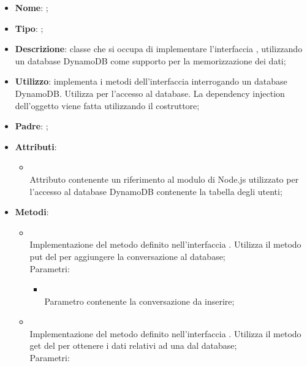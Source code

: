 \begin{itemize}
	\item \textbf{Nome}: ;
	\item \textbf{Tipo}: ;
	\item \textbf{Descrizione}: classe che si occupa di implementare l'interfaccia , utilizzando un database DynamoDB come supporto per la memorizzazione dei dati;
	\item \textbf{Utilizzo}: implementa i metodi dell'interfaccia  interrogando un database DynamoDB. Utilizza  per l'accesso al database. La dependency injection dell'oggetto  viene fatta utilizzando il costruttore;
	\item \textbf{Padre}: ;
	\item \textbf{Attributi}:
	\begin{itemize}
		\item[]  \\
		Attributo contenente un riferimento al modulo di Node.js utilizzato per l'accesso al database DynamoDB contenente la tabella degli utenti;
	\end{itemize}
	\item \textbf{Metodi}:
	\begin{itemize}
		\item[]  \\
		Implementazione del metodo definito nell'interfaccia . Utilizza il metodo put del  per aggiungere la conversazione al database;\\
		Parametri:
		\begin{itemize}
			\item {} \\
			Parametro contenente la conversazione da inserire;
		\end{itemize}
		\item[]  \\
		Implementazione del metodo definito nell'interfaccia . Utilizza il metodo get del  per ottenere i dati relativi ad una  dal database;\\
		Parametri:
		\begin{itemize}

\end{itemize}
\end{itemize}
\end{itemize}
